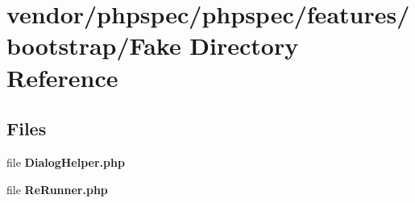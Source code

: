 \section{vendor/phpspec/phpspec/features/bootstrap/\+Fake Directory Reference}
\label{dir_ef64c90ab9255bc127e0032d7c3827a0}
\subsection*{Files}
\begin{DoxyCompactItemize}
\item 
file {\bf Dialog\+Helper.\+php}
\item 
file {\bf Re\+Runner.\+php}
\end{DoxyCompactItemize}
